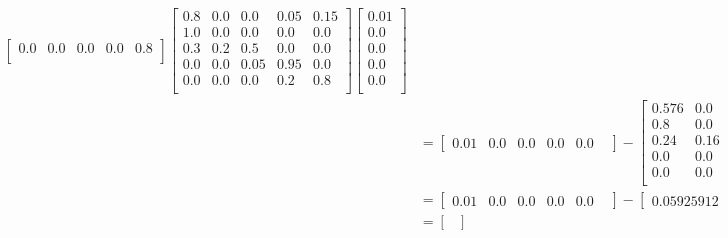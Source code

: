 \documentclass[11pt]{article}
\begin{document}
{\begin{enumerate}
\begin{align*}
\begin{bmatrix}
		0.0  & 0 .0 & 0.0 & 0.0 & 0.8 \\
		\end{bmatrix}
		\begin{bmatrix} 
		0.8  & 0.0 & 0.0 & 0.05 & 0.15 \\
		1.0  & 0.0 & 0.0 & 0.0   & 0.0 \\
		0.3  & 0.2 & 0.5 & 0.0 & 0.0 \\
		0.0  & 0.0 & 0.05 & 0.95 & 0.0 \\
		0.0  & 0.0 & 0.0 & 0.2 & 0.8 \\
		\end{bmatrix}
		\begin{bmatrix} 
		0.01 \\
		0.0 	\\
		0.0 	\\
		0.0 	\\
		0.0 	\\
		\end{bmatrix}\\
&=
		\begin{bmatrix} 
		0.01 &
		0.0 	&
		0.0 	&
		0.0 	&
		0.0 	&
		\end{bmatrix}
		 - 
		\begin{bmatrix} 
		0.576  	& 0.0 	& 0.0 	& 0.036 	& 0.108 \\
		0.8  		& 0.0 	& 0.0 	&  0.0   	& 0.0 \\
		0.24  	& 0.16 	& 0.4 	& 0.0 	& 0.0 \\
		0.0  		& 0.0 	& 0.04 	& 0.76 	& 0.0 \\
		0.0  		& 0.0 	& 0.0 	& 0.16 	& 0.64 \\
		\end{bmatrix}
		\begin{bmatrix} 
		0.01 \\
		0.0 	\\
		0.0 	\\
		0.0 	\\
		0.0 	\\
		\end{bmatrix}\\
&=
		\begin{bmatrix} 
		0.01 &
		0.0 	&
		0.0 	&
		0.0 	&
		0.0 	&
		\end{bmatrix}
		 - 
		\begin{bmatrix} 
		0.05925912    &
		0.09257881    &
		0.09738077 	&
		0.02193127 	&
		0.00471134 	&
		\end{bmatrix}\\
&=
		\begin{bmatrix} 

\end{bmatrix}
\end{align*}
\end{enumerate}}
\end{document}
